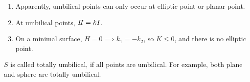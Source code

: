 \begin{remark}\hfill
\begin{enumerate}[(1)]
    \item Apparently, umbilical points can only occur at elliptic point or
        planar point.
    \item At umbilical points, \(I\!I=kI\).
    \item On a minimal surface, \(H=0\implies k_1=-k_2\), so \(K\le 0\), and there
        is no elliptic point.
\end{enumerate}
\end{remark}

\begin{definition}
    \(S\) is called totally umbilical, if all points are umbilical. For example,
    both plane and sphere are totally umbilical.
\end{definition}

